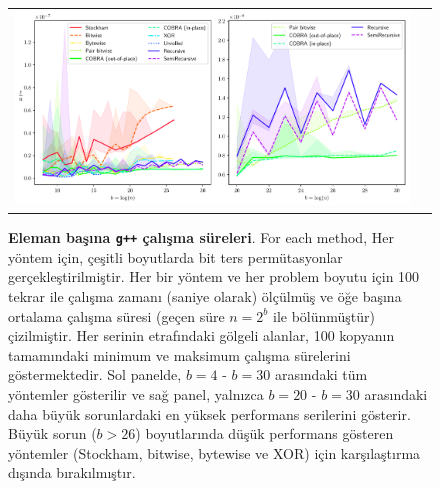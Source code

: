 \documentclass[10pt]{article}
\begin{document}
\begin{figure}[ht!]
\centering
\begin{tabular}{cc}
  \includegraphics[width=6in]{results/g++_run_times.pdf}
\end{tabular}
\caption{{\bf Eleman ba\c{s}{\i}na {\tt g++} \c{c}al{\i}\c{s}ma s\"{u}releri}. For each method,
Her y\"{o}ntem i\c{c}in, \c{c}e\c{s}itli boyutlarda bit ters perm\"{u}tasyonlar ger\c{c}ekle\c{s}tirilmi\c{s}tir. 
Her bir y\"{o}ntem ve her problem boyutu i\c{c}in 100 tekrar ile \c{c}al{\i}\c{s}ma 
zaman{\i} (saniye olarak) \"{o}l\c{c}\"{u}lm\"{u}\c{s} ve \"{o}\u{g}e ba\c{s}{\i}na ortalama \c{c}al{\i}\c{s}ma 
s\"{u}resi (ge\c{c}en s\"{u}re $n = 2^b$ ile b\"{o}l\"{u}nm\"{u}\c{s}t\"{u}r) \c{c}izilmi\c{s}tir. 
Her serinin etraf{\i}ndaki g\"{o}lgeli alanlar, 100 kopyan{\i}n tamam{\i}ndaki 
minimum ve maksimum \c{c}al{\i}\c{s}ma s\"{u}relerini g\"{o}stermektedir. Sol panelde, 
$b=4$ - $b=30$ aras{\i}ndaki t\"{u}m y\"{o}ntemler g\"{o}sterilir ve sa\u{g} panel, 
yaln{\i}zca $b=20$ - $b=30$ aras{\i}ndaki daha b\"{u}y\"{u}k sorunlardaki en y\"{u}ksek 
performans serilerini g\"{o}sterir. B\"{u}y\"{u}k sorun ($b>26$) boyutlar{\i}nda d\"{u}\c{s}\"{u}k 
performans g\"{o}steren y\"{o}ntemler (Stockham, bitwise, bytewise ve XOR) 
i\c{c}in kar\c{s}{\i}la\c{s}t{\i}rma d{\i}\c{s}{\i}nda b{\i}rak{\i}lm{\i}\c{s}t{\i}r.
  \label{fig:g++_runtimes}  
}
\end{figure}
\end{document}
